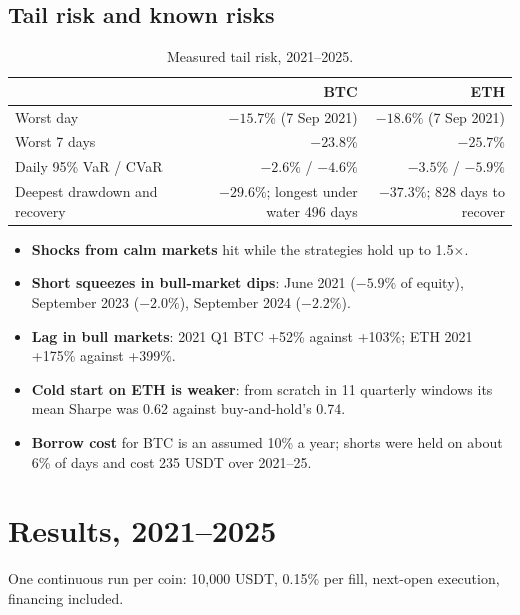 \documentclass[11pt,a4paper]{article}
\theoremstyle{definition}
\begin{document}
\subsection{Tail risk and known risks}
\begin{table}[htbp]\centering\small
\begin{tabular}{@{}lrr@{}}
\toprule
 & \textbf{BTC} & \textbf{ETH}\\
\midrule
Worst day & $-15.7\%$ (7 Sep 2021) & $-18.6\%$ (7 Sep 2021)\\
Worst 7 days & $-23.8\%$ & $-25.7\%$\\
Daily 95\% VaR / CVaR & $-2.6\%$ / $-4.6\%$ & $-3.5\%$ / $-5.9\%$\\
Deepest drawdown and recovery & $-29.6\%$; longest under water 496 days & $-37.3\%$; 828 days to recover\\
\bottomrule
\end{tabular}
\caption{Measured tail risk, 2021--2025.}
\end{table}
\begin{itemize}
\item \textbf{Shocks from calm markets} hit while the strategies hold up to 1.5$\times$.
\item \textbf{Short squeezes in bull-market dips}: June 2021 ($-5.9\%$ of equity), September 2023 ($-2.0\%$), September 2024 ($-2.2\%$).
\item \textbf{Lag in bull markets}: 2021 Q1 BTC +52\% against +103\%; ETH 2021 +175\% against +399\%.
\item \textbf{Cold start on ETH is weaker}: from scratch in 11 quarterly windows its mean Sharpe was 0.62 against buy-and-hold's 0.74.
\item \textbf{Borrow cost} for BTC is an assumed 10\% a year; shorts were held on about 6\% of days and cost 235 USDT over 2021--25.
\end{itemize}

\section{Results, 2021--2025}
One continuous run per coin: 10{,}000 USDT, 0.15\% per fill, next-open execution, financing included.
\end{document}
